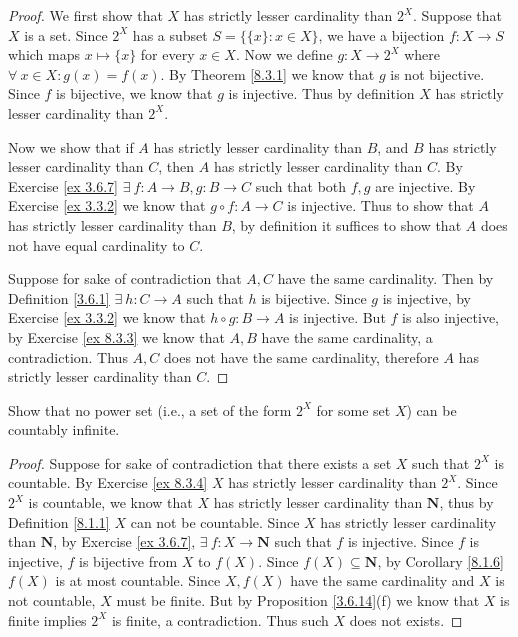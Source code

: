 \begin{proof}
    We first show that \(X\) has strictly lesser cardinality than \(2^X\).
    Suppose that \(X\) is a set.
    Since \(2^X\) has a subset \(S = \{\{x\} : x \in X\}\), we have a bijection \(f : X \to S\) which maps \(x \mapsto \{x\}\) for every \(x \in X\).
    Now we define \(g : X \to 2^X\) where \(\forall\ x \in X : g(x) = f(x)\).
    By Theorem \ref{8.3.1} we know that \(g\) is not bijective.
    Since \(f\) is bijective, we know that \(g\) is injective.
    Thus by definition \(X\) has strictly lesser cardinality than \(2^X\).

    Now we show that if \(A\) has strictly lesser cardinality than \(B\), and \(B\) has strictly lesser cardinality than \(C\), then \(A\) has strictly lesser cardinality than \(C\).
    By Exercise \ref{ex 3.6.7} \(\exists\ f : A \to B, g : B \to C\) such that both \(f, g\) are injective.
    By Exercise \ref{ex 3.3.2} we know that \(g \circ f : A \to C\) is injective.
    Thus to show that \(A\) has strictly lesser cardinality than \(B\), by definition it suffices to show that \(A\) does not have equal cardinality to \(C\).

    Suppose for sake of contradiction that \(A, C\) have the same cardinality.
    Then by Definition \ref{3.6.1} \(\exists\ h : C \to A\) such that \(h\) is bijective.
    Since \(g\) is injective, by Exercise \ref{ex 3.3.2} we know that \(h \circ g : B \to A\) is injective.
    But \(f\) is also injective, by Exercise \ref{ex 8.3.3} we know that \(A, B\) have the same cardinality, a contradiction.
    Thus \(A, C\) does not have the same cardinality, therefore \(A\) has strictly lesser cardinality than \(C\).
\end{proof}

\begin{exercise}\label{ex 8.3.5}
    Show that no power set (i.e., a set of the form \(2^X\) for some set \(X\)) can be countably infinite.
\end{exercise}

\begin{proof}
    Suppose for sake of contradiction that there exists a set \(X\) such that \(2^X\) is countable.
    By Exercise \ref{ex 8.3.4} \(X\) has strictly lesser cardinality than \(2^X\).
    Since \(2^X\) is countable, we know that \(X\) has strictly lesser cardinality than \(\mathbf{N}\), thus by Definition \ref{8.1.1} \(X\) can not be countable.
    Since \(X\) has strictly lesser cardinality than \(\mathbf{N}\), by Exercise \ref{ex 3.6.7}, \(\exists\ f : X \to \mathbf{N}\) such that \(f\) is injective.
    Since \(f\) is injective, \(f\) is bijective from \(X\) to \(f(X)\).
    Since \(f(X) \subseteq \mathbf{N}\), by Corollary \ref{8.1.6} \(f(X)\) is at most countable.
    Since \(X, f(X)\) have the same cardinality and \(X\) is not countable, \(X\) must be finite.
    But by Proposition \ref{3.6.14}(f) we know that \(X\) is finite implies \(2^X\) is finite, a contradiction.
    Thus such \(X\) does not exists.
\end{proof}
